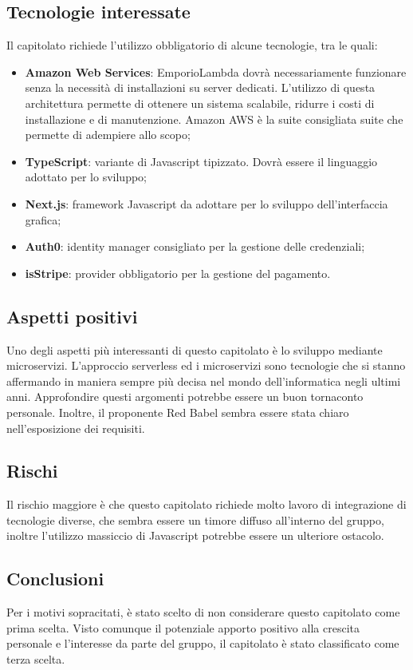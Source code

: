 \documentclass[../studio-di-fattibilita.tex]{subfiles}
\begin{document}
\subsection{Tecnologie interessate}%
\label{sub:tecnologie_interessate}
Il capitolato richiede l’utilizzo obbligatorio di alcune tecnologie, tra le quali:
\begin{itemize}
  \item \textbf{Amazon Web Services}: EmporioLambda dovrà necessariamente funzionare senza la necessità di installazioni su server dedicati. L’utilizzo di questa architettura permette di ottenere un sistema scalabile, ridurre i costi di installazione e di manutenzione. Amazon AWS è la suite consigliata suite che permette di adempiere allo scopo;
  \item \textbf{TypeScript}: variante di Javascript tipizzato. Dovrà essere il linguaggio adottato per lo sviluppo;
  \item \textbf{Next.js}: framework Javascript da adottare per lo sviluppo dell’interfaccia grafica;
  \item \textbf{Auth0}: identity manager consigliato per la gestione delle credenziali;
  \item \textbf{isStripe}: provider obbligatorio per la gestione del pagamento.
\end{itemize}

\subsection{Aspetti positivi}%
\label{sub:aspetti_positivi}
Uno degli aspetti più interessanti di questo capitolato è lo sviluppo mediante microservizi. L’approccio serverless ed i microservizi sono tecnologie che si stanno affermando in maniera sempre più decisa nel mondo dell’informatica negli ultimi anni. Approfondire questi argomenti potrebbe essere un buon tornaconto personale. Inoltre, il proponente Red Babel sembra essere stata chiaro nell’esposizione dei requisiti.

\subsection{Rischi}%
\label{sub:rischi}
Il rischio maggiore è che questo capitolato richiede molto lavoro di integrazione di tecnologie diverse, che sembra essere un timore diffuso all’interno del gruppo, inoltre l’utilizzo massiccio di Javascript potrebbe essere un ulteriore ostacolo.

\subsection{Conclusioni}%
\label{sub:Conclusioni}
Per i motivi sopracitati, è stato scelto di non considerare questo capitolato come prima scelta. Visto comunque il potenziale apporto positivo alla crescita personale e l’interesse da parte del gruppo, il capitolato è stato classificato come terza scelta.
\end{document}
